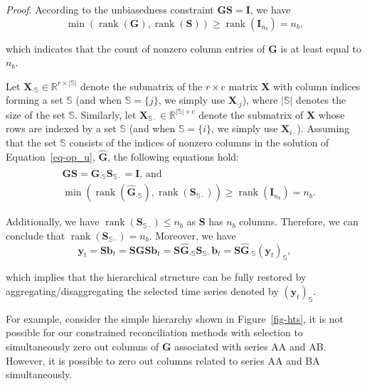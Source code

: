\documentclass[11pt,a4paper,]{article}
\begin{document}
\emph{Proof}. According to the unbiasedness constraint
\(\boldsymbol{GS}=\boldsymbol{I}\), we have \[
\min \left(\operatorname{rank}(\boldsymbol{G}), \operatorname{rank}(\boldsymbol{S})\right) \geq \operatorname{rank}(\boldsymbol{I}_{n_b})=n_b,
\]

which indicates that the count of nonzero column entries of
\(\boldsymbol{G}\) is at least equal to \(n_b\).

Let
\(\boldsymbol{X}_{\cdot \mathbb{S}} \in \mathbb{R}^{r \times |\mathbb{S}|}\)
denote the submatrix of the \(r \times c\) matrix \(\boldsymbol{X}\)
with column indices forming a set \(\mathbb{S}\) (and when
\(\mathbb{S} = \{j\}\), we simply use \(\boldsymbol{X}_{\cdot j}\)),
where \(|\mathbb{S}|\) denotes the size of the set \(\mathbb{S}\).
Similarly, let
\(\boldsymbol{X}_{\mathbb{S}\cdot} \in \mathbb{R}^{|\mathbb{S}| \times c}\)
denote the submatrix of \(\boldsymbol{X}\) whose rows are indexed by a
set \(\mathbb{S}\) (and when \(\mathbb{S} = \{i\}\), we simply use
\(\boldsymbol{X}_{i\cdot}\)). Assuming that the set \(\mathbb{S}\)
consists of the indices of nonzero columns in the solution of
Equation~\ref{eq-op_u}, \(\hat{\boldsymbol{G}}\), the following
equations hold: \[
\begin{aligned}
& \boldsymbol{G}\boldsymbol{S} = \hat{\boldsymbol{G}}_{\cdot \mathbb{S}}\boldsymbol{S}_{\mathbb{S}\cdot} = \boldsymbol{I} \text{, and } \\
& \min \left(\operatorname{rank}(\hat{\boldsymbol{G}}_{\cdot \mathbb{S}}), \operatorname{rank}(\boldsymbol{S}_{\mathbb{S}\cdot})\right) \geq \operatorname{rank}(\boldsymbol{I}_{n_b})=n_b.
\end{aligned}
\]

Additionally, we have
\(\operatorname{rank}(\boldsymbol{S}_{\mathbb{S}\cdot}) \leq n_b\) as
\(\boldsymbol{S}\) has \(n_b\) columns. Therefore, we can conclude that
\(\operatorname{rank}(\boldsymbol{S}_{\mathbb{S}\cdot}) = n_b\).
Moreover, we have \[
\boldsymbol{y}_t = \boldsymbol{S}\boldsymbol{b}_t = \boldsymbol{S}\boldsymbol{G}\boldsymbol{S}\boldsymbol{b}_t=\boldsymbol{S}\hat{\boldsymbol{G}}_{\cdot\mathbb{S}}\boldsymbol{S}_{\mathbb{S}\cdot}\boldsymbol{b}_t=\boldsymbol{S}\hat{\boldsymbol{G}}_{\cdot \mathbb{S}}(\boldsymbol{y}_t)_{\mathbb{S}},
\]

which implies that the hierarchical structure can be fully restored by
aggregating/disaggregating the selected time series denoted by
\((\boldsymbol{y}_{t})_{\mathbb{S}}\).

For example, consider the simple hierarchy shown in
Figure~\ref{fig-hts}, it is not possible for our constrained
reconciliation methods with selection to simultaneously zero out columns
of \(\boldsymbol{G}\) associated with series AA and AB. However, it is
possible to zero out columns related to series AA and BA simultaneously.
\end{document}
